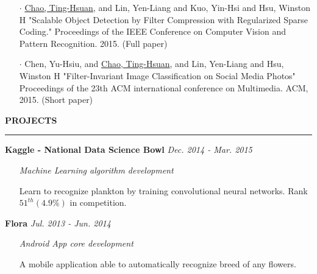 \documentclass[11pt,letterpaper]{article}
\begin{document}
\begin{itemize}
	\itemsep=-0.5em
	\item[$\cdot$] \underline{Chao, Ting-Hsuan}, and Lin, Yen-Liang and Kuo, Yin-Hsi and Hsu, Winston H "Scalable Object Detection by Filter Compression with Regularized Sparse Coding." Proceedings of the IEEE Conference on Computer Vision and Pattern Recognition. 2015. (Full paper)
	\item[$\cdot$] Chen, Yu-Hsiu, and \underline{Chao, Ting-Hsuan}, and Lin, Yen-Liang and Hsu, Winston H "Filter-Invariant Image Classification on Social Media Photos" Proceedings of the 23th ACM international conference on Multimedia. ACM, 2015. (Short paper)
\end{itemize}

\pagebreak


%
%

\vspace{1em}
\noindent
\MakeUppercase{\bf Projects}
\vspace{0.5em}
\hrule

%
\noindent \hspace{1.2em}
{\bf Kaggle - National Data Science Bowl} \hfill {\em Dec. 2014 - Mar. 2015}
\vspace{-0.5em}
\begin{itemize}[leftmargin=1.5em] \item[] {\em Machine Learning algorithm development} \end{itemize}
\vspace{-0.5em}
\begin{itemize}[leftmargin=1.5em]
	\itemsep=-0.5em
	\item[] Learn to recognize plankton by training convolutional neural networks. Rank $51^{th} (4.9\%)$ in competition.
\end{itemize}

%
\noindent \hspace{1.2em}
{\bf Flora} \hfill {\em Jul. 2013 - Jun. 2014}
\vspace{-0.5em}
\begin{itemize}[leftmargin=1.5em] \item[] {\em Android App core development} \end{itemize}
\vspace{-0.5em}
\begin{itemize}[leftmargin=1.5em]
	\itemsep=-0.5em
	\item[] A mobile application able to automatically recognize breed of any flowers.
\end{itemize}
\end{document}
